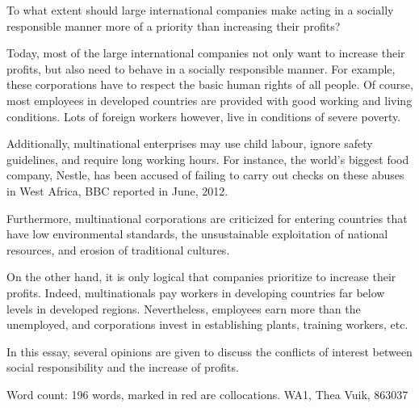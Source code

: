 \documentclass[a4paper,11pt]{article}
\begin{document}
\begin{center}
To what extent should large international companies make acting in a socially responsible manner more of a priority than increasing their profits?
\end{center}


Today, most of the {\color{red}large international companies} not only want to {\color{red}increase} their {\color{red}profits}, but also need to {\color{red}behave in} a {\color{red}socially responsible manner}. %
{\color{red}For example}, these corporations {\color{red}have} to {\color{red}respect} the {\color{red}basic human rights} of all people. %
Of course, most employees in {\color{red}developed countries} are {\color{red}provided with} good {\color{red}working} and {\color{red}living conditions}. %
Lots of {\color{red}foreign workers} however, {\color{red}live in conditions} of {\color{red}severe poverty}. %

Additionally, {\color{red}multinational enterprises} may use {\color{red}child labour}, ignore {\color{red}safety guidelines}, and require {\color{red}long working hours}. %
{\color{red}For instance}, the world's {\color{red}biggest food company}, Nestle, has been {\color{red}accused of} failing to {\color{red}carry out checks on} these abuses in West Africa, BBC reported in June, 2012. %

Furthermore, {\color{red}multinational corporations} are {\color{red}criticized for} entering countries that have {\color{red}low environmental standards}, the {\color{red} unsustainable exploitation} of {\color{red}national resources}, and erosion of {\color{red}traditional cultures}. %

On the other hand, it is only logical that companies prioritize to {\color{red}increase} their {\color{red}profits}. %
Indeed, multinationals pay workers in {\color{red}developing countries} far below levels in {\color{red}developed regions}. %
Nevertheless, employees earn more than the unemployed, and corporations invest in establishing plants, training workers, etc. %

In this essay, several opinions are given to discuss the {\color{red}conflicts of interest between social responsibility} and the {\color{red}increase} of {\color{red}profits}. %

\bigskip
Word count: 196 words, marked in red are collocations. WA1, Thea Vuik, 863037
\end{document}
